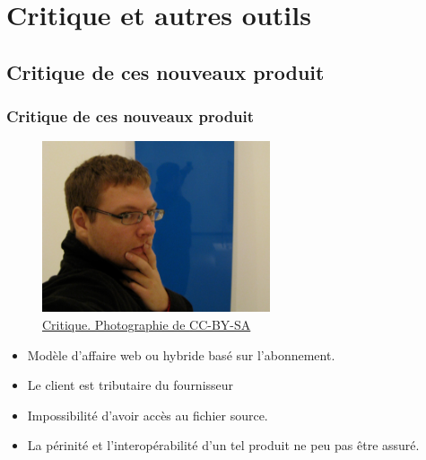 \section{Critique et autres outils} 
\subsection{Critique de ces nouveaux produit} 
		\begin{frame}[allowframebreaks]
			\frametitle{Critique de ces nouveaux produit}
			\begin{figure}
			\centering
                     \includegraphics[width = 0.6\textwidth]{critique.png}
                     \caption{\tiny{\href{run:critique.png}{Critique. Photographie de \citet{Mosler2007} CC-BY-SA}}}
                   \end{figure}
			\framebreak
			\begin {itemize}
				\item Modèle d'affaire web ou hybride basé sur l'abonnement.
				\item Le client est tributaire du fournisseur
				\item Impossibilité d'avoir accès au fichier source.
				\item La périnité et l'interopérabilité d'un tel produit ne peu pas être assuré.
				

			\end{itemize}																											\end{frame}		
			

